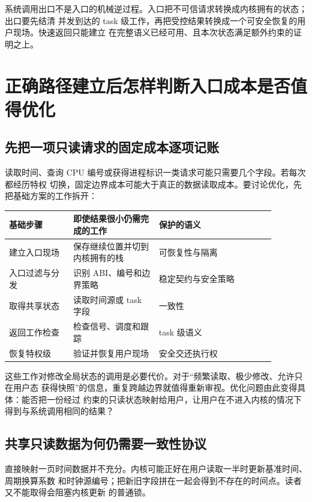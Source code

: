 \begin{keyidea}
系统调用出口不是入口的机械逆过程。入口把不可信请求转换成内核拥有的状态；出口要先结清
并发到达的 task 级工作，再把受控结果转换成一个可安全恢复的用户现场。快速返回只能建立
在完整语义已经可用、且本次状态满足额外约束的证明之上。
\end{keyidea}

\section{正确路径建立后怎样判断入口成本是否值得优化}

\subsection{先把一项只读请求的固定成本逐项记账}

读取时间、查询 CPU 编号或获得进程标识一类请求可能只需要几个字段。若每次都经历特权
切换，固定边界成本可能大于真正的数据读取成本。要讨论优化，先把基础方案的工作拆开：

\begin{longtable}{|L{0.21\linewidth}|L{0.29\linewidth}|L{0.38\linewidth}|}
\hline
基础步骤 & 即使结果很小仍需完成的工作 & 保护的语义 \\ \hline
建立入口现场 & 保存继续位置并切到内核拥有的栈 & 可恢复性与隔离 \\ \hline
入口过滤与分发 & 识别 ABI、编号和边界策略 & 稳定契约与安全策略 \\ \hline
取得共享状态 & 读取时间源或 task 字段 & 一致性 \\ \hline
返回工作检查 & 检查信号、调度和跟踪 & task 级语义 \\ \hline
恢复特权级 & 验证并恢复用户现场 & 安全交还执行权 \\ \hline
\end{longtable}

这些工作对修改全局状态的调用是必要代价。对于“频繁读取、极少修改、允许只在用户态
获得快照”的信息，重复跨越边界就值得重新审视。优化问题由此变得具体：能否把一份经过
约束的只读状态映射给用户，让用户在不进入内核的情况下得到与系统调用相同的结果？

\subsection{共享只读数据为何仍需要一致性协议}

直接映射一页时间数据并不充分。内核可能正好在用户读取一半时更新基准时间、周期换算系数
和时钟源编号；把新旧字段拼在一起会得到不存在的时间点。读者又不能取得会阻塞内核更新
的普通锁。

